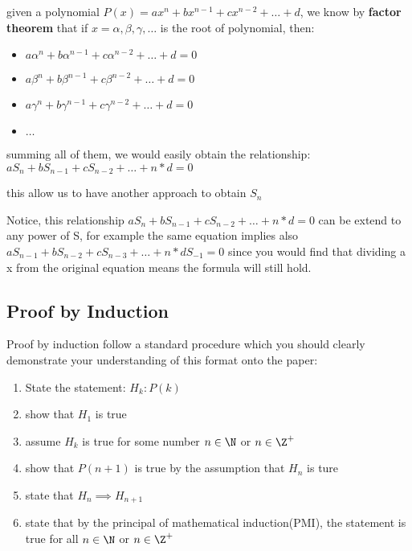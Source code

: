 \documentclass[]{article}
\begin{document}
given a polynomial \(P(x) = ax^n + bx^{n-1} + cx^{n-2} + \dots + d\), we
know by \textbf{factor theorem} that if
\(x = \alpha,\beta,\gamma,\dots\) is the root of polynomial, then:

\begin{itemize}
\item
  \(a\alpha^n + b\alpha^{n-1} + c\alpha^{n-2} + \dots + d = 0\)
\item
  \(a\beta^n + b\beta^{n-1} + c\beta^{n-2} + \dots + d = 0\)
\item
  \(a\gamma^n + b\gamma^{n-1} + c\gamma^{n-2} + \dots + d = 0\)
\item
  \(\dots\)
\end{itemize}

summing all of them, we would easily obtain the relationship:
\(aS_n + bS_{n-1} + cS_{n-2} + \dots + n*d = 0\)

this allow us to have another approach to obtain \(S_n\)

Notice, this relationship
\(aS_n + bS_{n-1} + cS_{n-2} + \dots + n*d = 0\) can be extend to any
power of S, for example the same equation implies also
\(aS_{n-1} + bS_{n-2} + cS_{n-3} + \dots + n*dS_{-1} = 0\) since you
would find that dividing a x from the original equation means the
formula will still hold.

\subsection{Proof by Induction}\label{header-n248}

Proof by induction follow a standard procedure which you should clearly
demonstrate your understanding of this format onto the paper:

\begin{enumerate}
\def\labelenumi{\arabic{enumi}.}
\item
  State the statement: \(H_k : P(k)\)
\item
  show that \(H_1\) is true
\item
  assume \(H_k\) is true for some number \(n\in \N\) or \(n \in \Z^+\)
\item
  show that \(P(n+1)\) is true by the assumption that \(H_n\) is ture
\item
  state that \(H_n \implies H_{n+1}\)
\item
  state that by the principal of mathematical induction(PMI), the
  statement is true for all \(n\in \N\) or \(n \in \Z^+\)
\end{enumerate}
\end{document}
